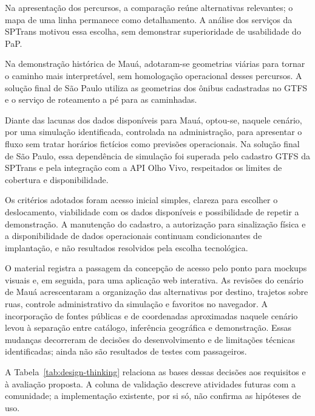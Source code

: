 \documentclass[12pt,oneside,a4paper,brazil,chapter=TITLE]{abntex2}
\begin{document}
Na apresentação dos percursos, a comparação reúne alternativas relevantes; o mapa de uma linha permanece como detalhamento. A análise dos serviços da SPTrans motivou essa escolha, sem demonstrar superioridade de usabilidade do PaP.

Na demonstração histórica de Mauá, adotaram-se geometrias viárias para tornar o caminho mais interpretável, sem homologação operacional desses percursos. A solução final de São Paulo utiliza as geometrias dos ônibus cadastradas no GTFS e o serviço de roteamento a pé para as caminhadas.

Diante das lacunas dos dados disponíveis para Mauá, optou-se, naquele cenário, por uma simulação identificada, controlada na administração, para apresentar o fluxo sem tratar horários fictícios como previsões operacionais. Na solução final de São Paulo, essa dependência de simulação foi superada pelo cadastro GTFS da SPTrans e pela integração com a API Olho Vivo, respeitados os limites de cobertura e disponibilidade.

Os critérios adotados foram acesso inicial simples, clareza para escolher o deslocamento, viabilidade com os dados disponíveis e possibilidade de repetir a demonstração. A manutenção do cadastro, a autorização para sinalização física e a disponibilidade de dados operacionais continuam condicionantes de implantação, e não resultados resolvidos pela escolha tecnológica.

O material registra a passagem da concepção de acesso pelo ponto para mockups visuais e, em seguida, para uma aplicação web interativa. As revisões do cenário de Mauá acrescentaram a organização das alternativas por destino, trajetos sobre ruas, controle administrativo da simulação e favoritos no navegador. A incorporação de fontes públicas e de coordenadas aproximadas naquele cenário levou à separação entre catálogo, inferência geográfica e demonstração. Essas mudanças decorreram de decisões do desenvolvimento e de limitações técnicas identificadas; ainda não são resultados de testes com passageiros.

A Tabela~\ref{tab:design-thinking} relaciona as bases dessas decisões aos requisitos e à avaliação proposta. A coluna de validação descreve atividades futuras com a comunidade; a implementação existente, por si só, não confirma as hipóteses de uso.
\end{document}
